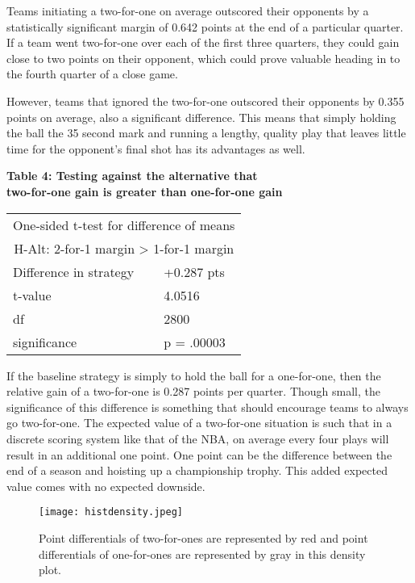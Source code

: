 \documentclass{article}
\begin{document}
Teams initiating a two-for-one on average outscored their opponents by a statistically significant margin of 0.642 points at the end of a particular quarter. If a team went two-for-one over each of the first three quarters, they could gain close to two points on their opponent, which could prove valuable heading in to the fourth quarter of a close game.

However, teams that ignored the two-for-one outscored their opponents by 0.355 points on average, also a significant difference. This means that simply holding the ball the 35 second mark and running a lengthy, quality play that leaves little time for the opponent's final shot has its advantages as well.

\begin{center}
\textbf{Table 4: Testing against the alternative that \\ two-for-one gain is greater than one-for-one gain \\}
\begin{tabular}{|l|l|}
\hline
\multicolumn{2}{|c|}{One-sided t-test for difference of means} \\
\multicolumn{2}{|c|}{H-Alt: 2-for-1 margin > 1-for-1 margin} \\
\hline
Difference in strategy & +0.287 pts \\ \hline
t-value & 4.0516 \\
df & 2800 \\
significance & p = .00003 \\
\hline
\end{tabular}
\end{center}

If the baseline strategy is simply to hold the ball for a one-for-one, then the relative gain of a two-for-one is 0.287 points per quarter. Though small, the significance of this difference is something that should encourage teams to always go two-for-one. The expected value of a two-for-one situation is such that in a discrete scoring system like that of the NBA, on average every four plays will result in an additional one point. One point can be the difference between the end of a season and hoisting up a championship trophy. This added expected value comes with no expected downside.

\begin{figure}[h]
\centering
\texttt{[image: histdensity.jpeg]}
\caption{Point differentials of two-for-ones are represented by red and point differentials of one-for-ones are represented by gray in this density plot.}
\end{figure}
\end{document}
